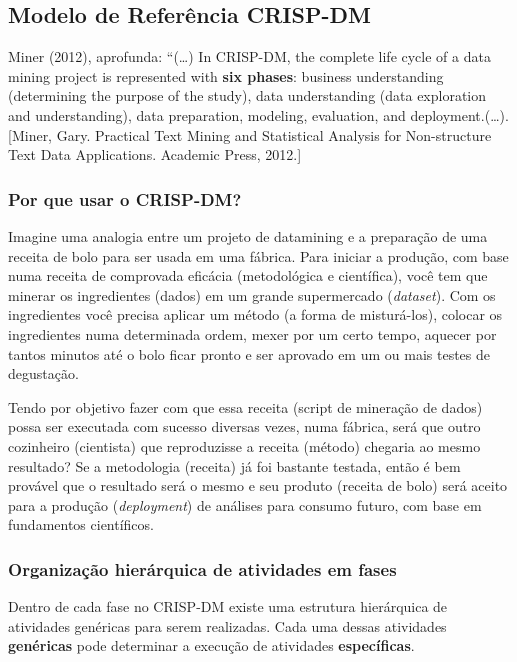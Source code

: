 \documentclass[]{article}
\begin{document}
\subsection{Modelo de Referência
CRISP-DM}\label{modelo-de-referencia-crisp-dm}

Miner (2012), aprofunda: ``(\ldots{}) In CRISP-DM, the complete life
cycle of a data mining project is represented with \textbf{six phases}:
business understanding (determining the purpose of the study), data
understanding (data exploration and understanding), data preparation,
modeling, evaluation, and deployment.(\ldots{}). {[}Miner, Gary.
Practical Text Mining and Statistical Analysis for Non-structure Text
Data Applications. Academic Press, 2012.{]}

\subsubsection{Por que usar o CRISP-DM?}\label{por-que-usar-o-crisp-dm}

Imagine uma analogia entre um projeto de datamining e a preparação de
uma receita de bolo para ser usada em uma fábrica. Para iniciar a
produção, com base numa receita de comprovada eficácia (metodológica e
científica), você tem que minerar os ingredientes (dados) em um grande
supermercado (\emph{dataset}). Com os ingredientes você precisa aplicar
um método (a forma de misturá-los), colocar os ingredientes numa
determinada ordem, mexer por um certo tempo, aquecer por tantos minutos
até o bolo ficar pronto e ser aprovado em um ou mais testes de
degustação.

Tendo por objetivo fazer com que essa receita (script de mineração de
dados) possa ser executada com sucesso diversas vezes, numa fábrica,
será que outro cozinheiro (cientista) que reproduzisse a receita
(método) chegaria ao mesmo resultado? Se a metodologia (receita) já foi
bastante testada, então é bem provável que o resultado será o mesmo e
seu produto (receita de bolo) será aceito para a produção
(\emph{deployment}) de análises para consumo futuro, com base em
fundamentos científicos.

\subsubsection{Organização hierárquica de atividades em
fases}\label{organizacao-hierarquica-de-atividades-em-fases}

Dentro de cada fase no CRISP-DM existe uma estrutura hierárquica de
atividades genéricas para serem realizadas. Cada uma dessas atividades
\textbf{genéricas} pode determinar a execução de atividades
\textbf{específicas}.
\end{document}
